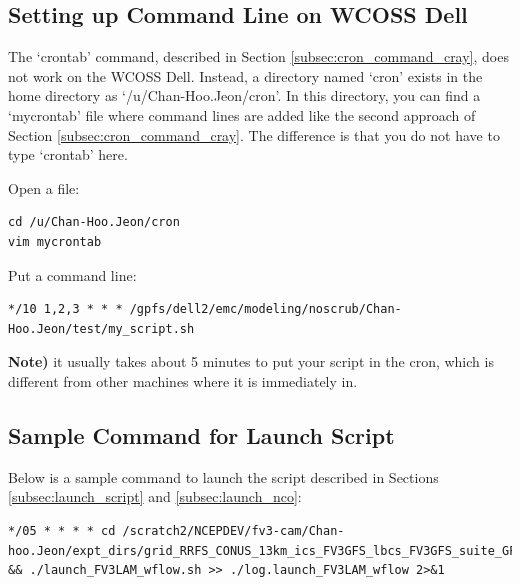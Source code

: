 \documentclass[11pt,fleqn]{report}              %
\begin{document}
\subsection{Setting up Command Line on WCOSS Dell}
\label{subsec:cron_command_dell}

The `crontab' command, described in Section \ref{subsec:cron_command_cray}, does not work on the WCOSS Dell. Instead, a directory named `cron' exists in the home directory as `/u/Chan-Hoo.Jeon/cron'. In this directory, you can find a `mycrontab' file where command lines are added like the second approach of Section \ref{subsec:cron_command_cray}. The difference is that you do not have to type `crontab' here. 

\vspace{0.3cm}

Open a file:
\lstset{language=bash}   
\begin{lstlisting}[frame=trBL]
cd /u/Chan-Hoo.Jeon/cron
vim mycrontab
\end{lstlisting}

Put a command line:
\lstset{language=bash}   
\begin{lstlisting}[frame=trBL]
*/10 1,2,3 * * * /gpfs/dell2/emc/modeling/noscrub/Chan-Hoo.Jeon/test/my_script.sh
\end{lstlisting}

\vspace{0.3cm}

{\bf Note)} it usually takes about 5 minutes to put your script in the cron, which is different from other machines where it is immediately in.



\subsection{Sample Command for Launch Script}
\label{subsec:we2e_sample_launch}

Below is a sample command to launch the script described in Sections \ref{subsec:launch_script} and \ref{subsec:launch_nco}:

\lstset{language=bash}   
\begin{lstlisting}[frame=trBL]
*/05 * * * * cd /scratch2/NCEPDEV/fv3-cam/Chan-hoo.Jeon/expt_dirs/grid_RRFS_CONUS_13km_ics_FV3GFS_lbcs_FV3GFS_suite_GFS_v15p2 && ./launch_FV3LAM_wflow.sh >> ./log.launch_FV3LAM_wflow 2>&1
\end{lstlisting}
\end{document}
